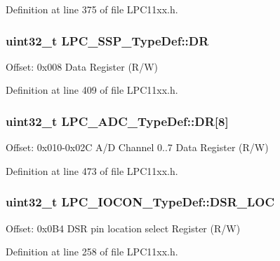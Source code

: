 Definition at line 375 of file L\+P\+C11xx.\+h.

\subsubsection[{\texorpdfstring{DR}{DR}}]{ uint32\+\_\+t L\+P\+C\+\_\+\+S\+S\+P\+\_\+\+Type\+Def\+::\+DR}\hypertarget{group___l_p_c11xx___definitions_ga305381985bf14d72c35b97ac3b56661e}{}\label{group___l_p_c11xx___definitions_ga305381985bf14d72c35b97ac3b56661e}
Offset\+: 0x008 Data Register (R/W) 

Definition at line 409 of file L\+P\+C11xx.\+h.

\subsubsection[{\texorpdfstring{DR}{DR}}]{ uint32\+\_\+t L\+P\+C\+\_\+\+A\+D\+C\+\_\+\+Type\+Def\+::\+DR\mbox{[}8\mbox{]}}\hypertarget{group___l_p_c11xx___definitions_gacb2fe5ff342d70582f0f476c880ab2cc}{}\label{group___l_p_c11xx___definitions_gacb2fe5ff342d70582f0f476c880ab2cc}
Offset\+: 0x010-\/0x02C A/D Channel 0..7 Data Register (R/W) 

Definition at line 473 of file L\+P\+C11xx.\+h.

\subsubsection[{\texorpdfstring{D\+S\+R\+\_\+\+L\+OC}{DSR_LOC}}]{ uint32\+\_\+t L\+P\+C\+\_\+\+I\+O\+C\+O\+N\+\_\+\+Type\+Def\+::\+D\+S\+R\+\_\+\+L\+OC}\hypertarget{group___l_p_c11xx___definitions_ga8c4a13589d65569c8a92ad3bfdb74ad6}{}\label{group___l_p_c11xx___definitions_ga8c4a13589d65569c8a92ad3bfdb74ad6}
Offset\+: 0x0\+B4 D\+SR pin location select Register (R/W) 

Definition at line 258 of file L\+P\+C11xx.\+h.

